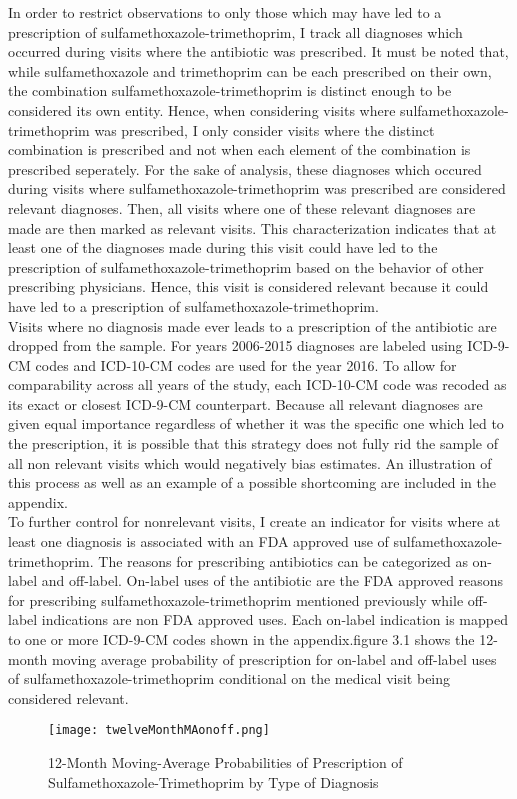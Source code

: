 \indent In order to restrict observations to only those which may have led to a prescription of sulfamethoxazole-trimethoprim, I track all diagnoses which occurred during visits where the antibiotic was prescribed. It must be noted that, while sulfamethoxazole and trimethoprim can be each prescribed on their own, the combination sulfamethoxazole-trimethoprim is distinct enough to be considered its own entity. Hence, when considering visits where sulfamethoxazole-trimethoprim was prescribed, I only consider visits where the distinct combination is prescribed and not when each element of the combination is prescribed seperately. For the sake of analysis, these diagnoses which occured during visits where sulfamethoxazole-trimethoprim was prescribed are considered relevant diagnoses. Then, all visits where one of these relevant diagnoses are made are then marked as relevant visits. This characterization indicates that at least one of the diagnoses made during this visit could have led to the prescription of sulfamethoxazole-trimethoprim based on the behavior of other prescribing physicians. Hence, this visit is considered relevant because it could have led to a prescription of sulfamethoxazole-trimethoprim.\\
\indent Visits where no diagnosis made ever leads to a prescription of the antibiotic are dropped from the sample. For years 2006-2015 diagnoses are labeled using ICD-9-CM codes and ICD-10-CM codes are used for the year 2016. To allow for comparability across all years of the study, each ICD-10-CM code was recoded as its exact or closest ICD-9-CM counterpart. Because all relevant diagnoses are given equal importance regardless of whether it was the specific one which led to the prescription, it is possible that this strategy does not fully rid the sample of all non relevant visits which would negatively bias estimates. An illustration of this process as well as an example of a possible shortcoming are included in the appendix.\\
\indent To further control for nonrelevant visits, I create an indicator for visits where at least one diagnosis is associated with an FDA approved use of sulfamethoxazole-trimethoprim. The reasons for prescribing antibiotics can be categorized as on-label and off-label. On-label uses of the antibiotic are the FDA approved reasons for prescribing sulfamethoxazole-trimethoprim mentioned previously while off-label indications are non FDA approved uses. Each on-label indication is mapped to one or more ICD-9-CM codes shown in the appendix.figure 3.1 shows the 12-month moving average probability of prescription for on-label and off-label uses of sulfamethoxazole-trimethoprim conditional on the medical visit being considered relevant.
\begin{figure}
\centering
\texttt{[image: twelveMonthMAonoff.png]}
\caption{12-Month Moving-Average Probabilities of Prescription of Sulfamethoxazole-Trimethoprim by Type of Diagnosis}
\end{figure}
\newpage
